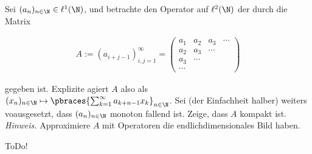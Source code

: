 \begin{exercise}[20/1]

Sei $(a_n)_{n \in \N} \in \ell^1(\N)$, und betrachte den Operator auf $\ell^2(\N)$ der durch die Matrix

\begin{align*}
  A
  :=
  (a_{i+j-1})_{i,j = 1}^\infty
  =
  \begin{pmatrix}
    a_1    & a_2    & a_3    & \cdots \\
    a_2    & a_3    & \cdots &        \\
    a_3    & \cdots &        &        \\
    \cdots &        &        &
  \end{pmatrix}
\end{align*}

gegeben ist.
Explizite agiert $A$ also als $(x_n)_{n \in \N} \mapsto \pbraces{\sum_{k=1}^\infty a_{k+n-1} x_k}_{n \in \N}$.
Sei (der Einfachheit halber) weiters voausgesetzt, dass $(a_n)_{n \in \N}$ monoton fallend ist.
Zeige, dass $A$ kompakt ist. \\

\textit{Hinweis.}
Approximiere $A$ mit Operatoren die endlichdimensionales Bild haben.

\end{exercise}

\begin{solution}

ToDo!

\end{solution}
